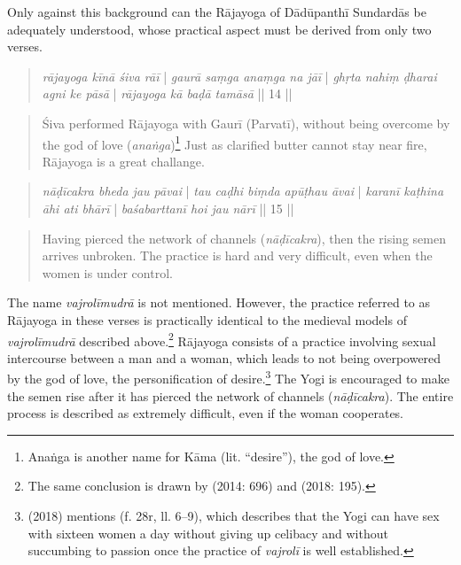 Only against this background can the Rājayoga of Dādūpanthī Sundardās be adequately understood, whose practical aspect must be derived from only two verses.

\begin{quote}
\textit{rājayoga kīnā śiva rāī} | \textit{gaurā saṃga anaṃga na jāī} |
\textit{ghṛta nahiṃ ḍharai agni ke pāsā} | \textit{rājayoga kā baḍā tamāsā} || 14 ||
\end{quote}
\begin{quote}
Śiva performed Rājayoga with Gaurī (Parvatī), without being overcome by the god of love (\textit{anaṅga})\footnote{Anaṅga is another name for Kāma (lit. ``desire''), the god of love.} Just as clarified butter cannot stay near fire, Rājayoga is a great challange.   
\end{quote}
\begin{quote}
\textit{nāḍīcakra bheda jau pāvai} | \textit{tau caḍhi biṃda apūṭhau āvai} | 
\textit{karanī kaṭhina āhi ati bhārī} | \textit{baśabarttanī hoi jau nārī} || 15 || 
\end{quote}
\begin{quote}
  Having pierced the network of channels (\textit{nāḍīcakra}), then the rising semen arrives unbroken.
  The practice is hard and very difficult, even when the women is under control. 
\end{quote}

The name \textit{vajrolīmudrā} is not mentioned. However, the practice referred to as Rājayoga in these verses is practically identical to the medieval models of \textit{vajrolīmudrā} described above.\footnote{The same conclusion is drawn by \citeauthor{burger2014sarvangayogapradipika} (2014: 696) and \citeauthor{mallinson2018vajrolimudra} (2018: 195).} Rājayoga consists of a practice involving sexual intercourse between a man and a woman, which leads to not being overpowered by the god of love, the personification of desire.\footnote{\citeauthor{mallinson2018vajrolimudra} (2018) mentions  (f. 28r, ll. 6–9), which describes that the Yogi can have sex with sixteen women a day without giving up celibacy and without succumbing to passion once the practice of \textit{vajrolī} is well established.} The Yogi is encouraged to make the semen rise after it has pierced the network of channels (\textit{nāḍīcakra}). The entire process is described as extremely difficult, even if the woman cooperates.

